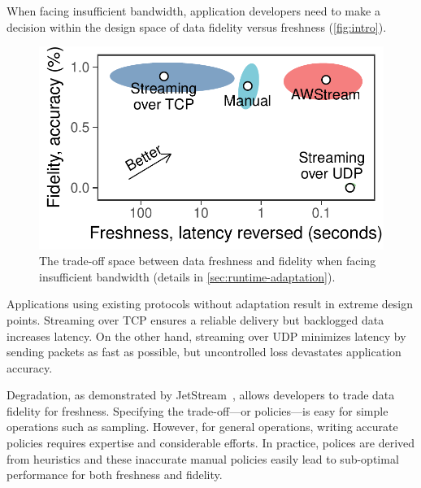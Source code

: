 When facing insufficient bandwidth, application developers need to make a
decision within the design space of data fidelity versus freshness
(\autoref{fig:intro}).

\begin{figure}
  \centering
  \includegraphics[width=0.8\columnwidth]{figures/figure1.pdf}
  \caption{The trade-off space between data freshness and fidelity when facing
    insufficient bandwidth (details in \autoref{sec:runtime-adaptation}).}
  \label{fig:intro}
  \vspace{-1em}
\end{figure}

Applications using existing protocols without adaptation result in extreme
design points. Streaming over TCP ensures a reliable delivery but backlogged
data increases latency. On the other hand, streaming over UDP minimizes latency
by sending packets as fast as possible, but uncontrolled loss devastates
application accuracy.

Degradation, as demonstrated by JetStream~\cite{rabkin2014aggregation}, allows
developers to trade data fidelity for freshness. Specifying the trade-off---or
policies---is easy for simple operations such as sampling. However, for general
operations, writing accurate policies requires expertise and considerable
efforts. In practice, polices are derived from heuristics and these inaccurate
manual policies easily lead to sub-optimal performance for both freshness and
fidelity.



